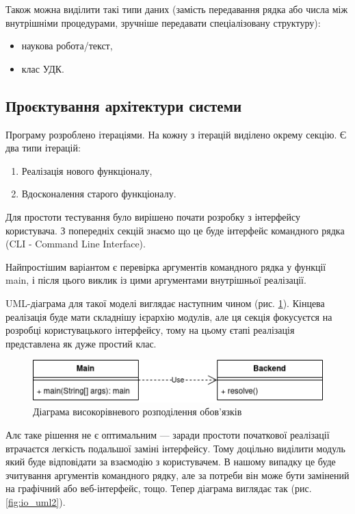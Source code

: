 \documentclass[14pt]{extarticle}
\begin{document}
  Також можна виділити такі типи даних (замість передавання рядка або числа між внутрішніми процедурами, зручніше передавати спеціалізовану структуру):
  \begin{itemize}[labelindent=\dimexpr{}\relax, leftmargin=*]
    \item наукова робота/текст,
    \item клас УДК.
  \end{itemize}

  \subsection{Проєктування архітектури системи}
  Програму розроблено ітераціями. На кожну з ітерацій виділено окрему секцію. Є два типи ітерацій:
  \begin{enumerate}[labelindent=\dimexpr\parindent*2\relax, leftmargin=*]
    \item Реалізація нового функціоналу,
    \item Вдосконалення старого функціоналу.
  \end{enumerate}
  Для простоти тестування було вирішено почати розробку з інтерфейсу користувача.
  З попередніх секцій знаємо що це буде інтерфейс командного рядка
  (CLI - Command Line Interface).

  Найпростішим варіантом
  є перевірка аргументів командного рядка у функції main,
  і після цього виклик із цими аргументами внутрішньої реалізації.

  UML-діаграма для такої моделі виглядає наступним чином
  (рис. \ref{fig:io_uml1}).
  Кінцева реалізація буде мати складнішу ієрархію модулів,
  але ця секція фокусуєтся на розробці користувацького інтерфейсу,
  тому на цьому єтапі реалізація представлена як дуже простий клас.

  \begin{figure}[H]
    \centering
    \includegraphics{io_uml1.drawio.png}    
    \caption{Діаграма високорівневого розподілення обов'язків}
    \label{fig:io_uml1}
  \end{figure}

  Алє таке рішення не є оптимальним ---
  заради простоти початкової реалізації
  втрачаєтся легкість подальшої заміні інтерфейсу.
  Тому доцільно виділити модуль який буде відповідати
  за взаємодію з користувачем.
  В нашому випадку це буде зчитування аргументів командного рядку,
  але за потреби він може бути замінений на графічний або веб-інтерфейс, тощо.
  Тепер діаграма виглядає так (рис. \ref{fig:io_uml2}).
\end{document}
